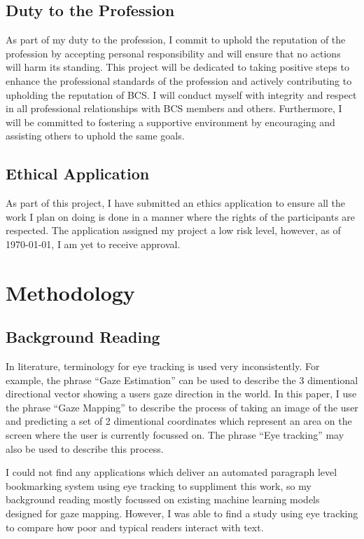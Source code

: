\documentclass[twocolumn]{report}
\begin{document}
\section{Duty to the Profession}   

As part of my duty to the profession, I commit to uphold the reputation of the profession by accepting personal responsibility and will ensure that no actions will harm its standing. This project will be dedicated to taking positive steps to enhance the professional standards of the profession and actively contributing to upholding the reputation of BCS. I will conduct myself with integrity and respect in all professional relationships with BCS members and others. Furthermore, I will be committed to fostering a supportive environment by encouraging and assisting others to uphold the same goals. 

\section{Ethical Application}

As part of this project, I have submitted an ethics application to ensure all the work I plan on doing is done in a manner where the rights of the participants are respected. The application assigned my project a low risk level, however, as of \today, I am yet to receive approval. 

\chapter{Methodology}

\section{Background Reading}

\noindent
In literature, terminology for eye tracking is used very inconsistently. For example, the phrase ``Gaze Estimation'' can be used to describe the 3 dimentional directional vector showing a users gaze direction in the world. In this paper, I use the phrase ``Gaze Mapping'' to describe the process of taking an image of the user and predicting a set of 2 dimentional coordinates which represent an area on the screen where the user is currently focussed on. The phrase ``Eye tracking'' may also be used to describe this process. 

I could not find any applications which deliver an automated paragraph level bookmarking system using eye tracking to suppliment this work, so my background reading mostly focussed on existing machine learning models designed for gaze mapping. However, I was able to find a study \cite{barzvi2020eyetrackingdigialreading} using eye tracking to compare how poor and typical readers interact with text. 
\end{document}
